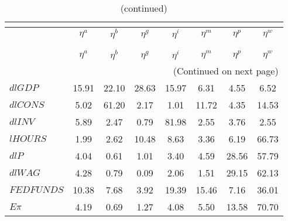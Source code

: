  
\begin{center}
\begin{longtable}{lccccccc} 
\caption{VARIANCE DECOMPOSITION (in percent)}\\
 \label{Table:th_var_decomp_uncond}\\
\toprule 
$            $	 & 	 $     {\eta^a}$	 & 	 $     {\eta^b}$	 & 	 $     {\eta^g}$	 & 	 $     {\eta^i}$	 & 	 $     {\eta^m}$	 & 	 $   {\eta^{p}}$	 & 	 $   {\eta^{w}}$\\
\midrule \endfirsthead 
\caption{(continued)}\\
 \toprule \\ 
$            $	 & 	 $     {\eta^a}$	 & 	 $     {\eta^b}$	 & 	 $     {\eta^g}$	 & 	 $     {\eta^i}$	 & 	 $     {\eta^m}$	 & 	 $   {\eta^{p}}$	 & 	 $   {\eta^{w}}$\\
\midrule \endhead 
\midrule \multicolumn{8}{r}{(Continued on next page)} \\ \bottomrule \endfoot 
\bottomrule \endlastfoot 
${dlGDP}     $	 & 	         15.91	 & 	         22.10	 & 	         28.63	 & 	         15.97	 & 	          6.31	 & 	          4.55	 & 	          6.52 \\ 
${dlCONS}    $	 & 	          5.02	 & 	         61.20	 & 	          2.17	 & 	          1.01	 & 	         11.72	 & 	          4.35	 & 	         14.53 \\ 
${dlINV}     $	 & 	          5.89	 & 	          2.47	 & 	          0.79	 & 	         81.98	 & 	          2.55	 & 	          3.76	 & 	          2.55 \\ 
${lHOURS}    $	 & 	          1.99	 & 	          2.62	 & 	         10.48	 & 	          8.63	 & 	          3.36	 & 	          6.19	 & 	         66.73 \\ 
${dlP}       $	 & 	          4.04	 & 	          0.61	 & 	          1.01	 & 	          3.40	 & 	          4.59	 & 	         28.56	 & 	         57.79 \\ 
${dlWAG}     $	 & 	          4.28	 & 	          0.79	 & 	          0.09	 & 	          2.06	 & 	          1.51	 & 	         29.15	 & 	         62.13 \\ 
${FEDFUNDS}  $	 & 	         10.38	 & 	          7.68	 & 	          3.92	 & 	         19.39	 & 	         15.46	 & 	          7.16	 & 	         36.01 \\ 
${E\pi}      $	 & 	          4.19	 & 	          0.69	 & 	          1.27	 & 	          4.08	 & 	          5.50	 & 	         13.58	 & 	         70.70 \\ 
\end{longtable}
 \end{center}
